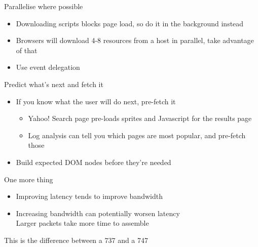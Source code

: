 \documentclass{beamer}
\begin{document}
\begin{frame}{Parallelise where possible}
  \begin{itemize}
  \item Downloading scripts blocks page load, so do it in the background instead
  \item Browsers will download 4-8 resources from a host in parallel, take advantage of that
  \item Use event delegation
  \end{itemize}
\end{frame}

\begin{frame}{Predict what's next and fetch it}
  \parbox[c][.1\paperheight]{\paperwidth}{}
  \begin{block}{}
  \begin{itemize}
  \item If you know what the user will do next, pre-fetch it
    \begin{itemize}
    \item Yahoo! Search page pre-loads sprites and Javascript for the results page
    \item Log analysis can tell you which pages are most popular, and pre-fetch those
    \end{itemize}
  \item Build expected DOM nodes before they're needed
  \end{itemize}
  \end{block}
  \parbox[c][.5\paperheight]{\paperwidth}{}
  \tiny{\color{white}{Ref:} \href{http://www.phpied.com/preload-cssjavascript-without-execution/}{} \color{white}{-- Stoyan Stefanov}}
\end{frame}

\begin{frame}{One more thing}
  \begin{itemize}
  \item Improving latency tends to improve bandwidth
  \item Increasing bandwidth can potentially worsen latency \\
        \tiny{Larger packets take more time to assemble}
  \end{itemize}
  This is the difference between a 737 and a 747
\end{frame}
\end{document}
